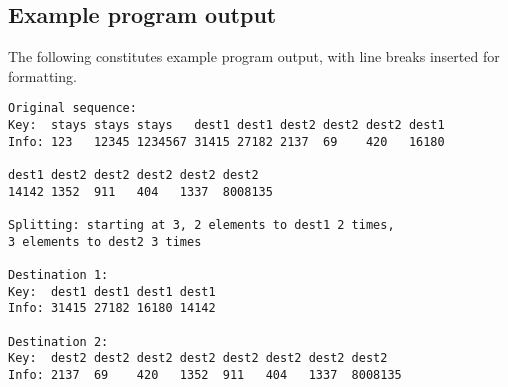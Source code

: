 ﻿\documentclass{article}
\begin{document}
\subsection{Example program output}

The following constitutes example program output, with line breaks inserted
for formatting.

\begin{verbatim}
Original sequence:
Key:  stays stays stays   dest1 dest1 dest2 dest2 dest2 dest1 
Info: 123   12345 1234567 31415 27182 2137  69    420   16180 

dest1 dest2 dest2 dest2 dest2 dest2
14142 1352  911   404   1337  8008135

Splitting: starting at 3, 2 elements to dest1 2 times,
3 elements to dest2 3 times

Destination 1:
Key:  dest1 dest1 dest1 dest1
Info: 31415 27182 16180 14142

Destination 2:
Key:  dest2 dest2 dest2 dest2 dest2 dest2 dest2 dest2
Info: 2137  69    420   1352  911   404   1337  8008135
\end{verbatim}
\end{document}
